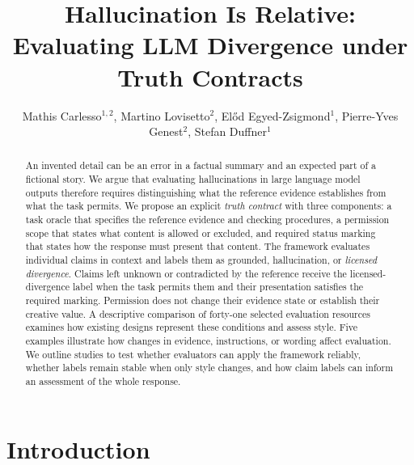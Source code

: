 \documentclass{clv2025}
\title{Hallucination Is Relative:
Evaluating LLM Divergence under Truth Contracts}
\author{Mathis Carlesso$^{1,2}$, Martino Lovisetto$^{2}$, El\H{o}d Egyed-Zsigmond$^{1}$, Pierre-Yves Genest$^{2}$, Stefan Duffner$^{1}$}
\affil{INSA Lyon, CNRS, LIRIS, UMR5205, Universit\'e Claude Bernard Lyon 1, 69621 Villeurbanne, France\\
  \quad \email{mathis.carlesso@insa-lyon.fr}}
\affil{Alteca, 69100 Villeurbanne, France}
\begin{document}
\maketitle


\begin{abstract}
An invented detail can be an error in a factual summary and an expected
part of a fictional story. We argue that evaluating hallucinations in
large language model outputs therefore requires distinguishing what the
reference evidence establishes from what the task permits. We propose an
explicit \emph{truth contract} with three components: a task oracle that
specifies the reference evidence and checking procedures, a permission
scope that states what content is allowed or excluded, and required status
marking that states how the response must present that content.
The framework evaluates individual claims in context and labels them as
grounded, hallucination, or \emph{licensed divergence}. Claims left unknown
or contradicted by the reference receive the licensed-divergence label
when the task permits them and their presentation satisfies the required
marking. Permission does not change their evidence state or establish
their creative value. A descriptive comparison of forty-one selected
evaluation resources examines how existing designs represent these
conditions and assess style. Five examples illustrate how changes in
evidence, instructions, or wording affect evaluation. We outline studies
to test whether evaluators can apply the framework reliably, whether
labels remain stable when only style changes, and how claim labels can
inform an assessment of the whole response.
\end{abstract}

\section{Introduction}\label{sec:intro}
\end{document}
